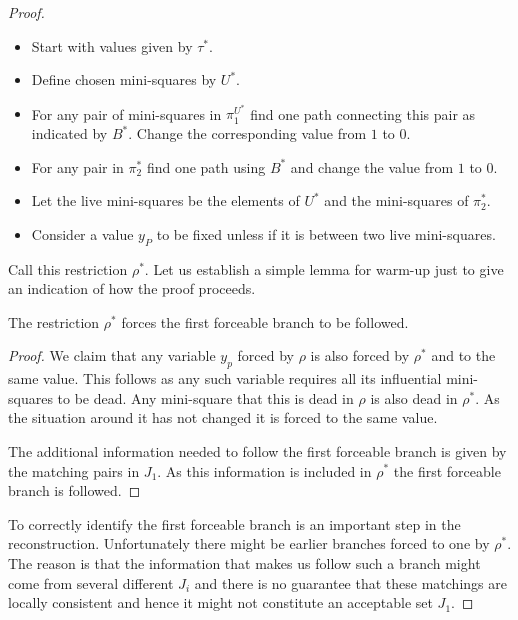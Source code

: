 \documentclass{theoretics}
\begin{document}
\begin{proof}
\begin{itemize}

\item Start with values given by $\tau^*$.

\item Define chosen mini-squares by $U^*$.

\item For any pair of mini-squares in $\pi_1^{U^*}$ 
find one path connecting this pair as
indicated by $B^*$.  Change the corresponding value
from $1$ to $0$.

\item For any pair in $\pi_2^*$ find one
path using $B^*$ and change the value from $1$ to
$0$.

\item Let the live mini-squares be the elements of
$U^*$ and the mini-squares of $\pi_2^*$.

\item Consider a value $y_P$ to be fixed unless if
it is between two live mini-squares.

\end{itemize}

Call this restriction $\rho^*$.  Let us establish
a simple lemma for warm-up just to give an indication
of how the proof proceeds.

\begin{lemma}
The restriction $\rho^*$ forces the first forceable branch
to be followed.  
\end{lemma}

\begin{proof}
We claim that any variable $y_p$ forced by $\rho$ is also forced by $\rho^*$
and to the same value.
This follows as any such variable requires all
its influential mini-squares to be dead.  Any mini-square
that this is dead in $\rho$ is also dead in $\rho^*$.  As the 
situation around it has not changed it is forced to the same
value.

The additional information needed to follow the first forceable branch
is given by the matching pairs in $J_1$.  As this information is included in
$\rho^*$ the first forceable branch is followed.
\end{proof}

To correctly identify the first forceable branch is an important 
step in the reconstruction.  Unfortunately there might be earlier
branches forced to one by $\rho^*$.  The reason is that the
information that makes us follow such a branch might come
from several different $J_i$ and there is no guarantee
that these matchings are locally consistent and hence
it might not constitute an acceptable set $J_1$.  


\end{proof}
\end{document}
